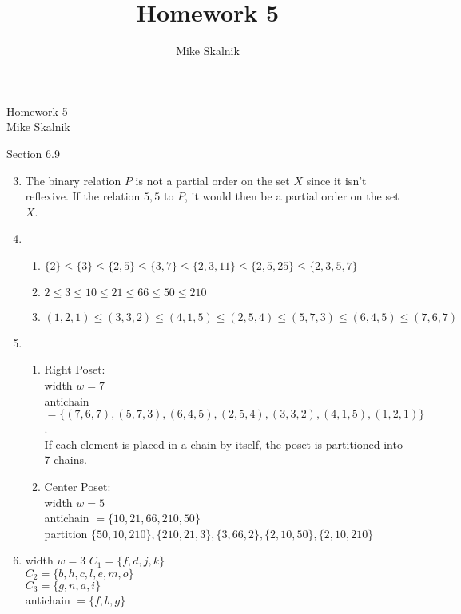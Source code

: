 \documentclass[12pt]{article}
\title{Homework 5}
\author{Mike Skalnik}
\newcommand{\s}[1]{\setcounter{enumi}{#1}}
\begin{document}
\begin{flushright}{\large Homework 5\\ Mike Skalnik}\end{flushright}

Section 6.9

\begin{enumerate}
  \s{2}
  
  \item The binary relation $P$ is not a partial order on the set $X$ since it isn't reflexive. If the relation ${5, 5}$ to $P$, it would then be a partial order on the set $X$.

  \s{5}
  
  \item
    \begin{enumerate}
      \item $\{2\} \le \{3\} \le \{2, 5\} \le \{3, 7\} \le \{2, 3, 11\} \le \{2, 5, 25\} \le \{2, 3, 5, 7\}$
      \item $2 \le 3 \le 10 \le 21 \le 66 \le 50 \le 210$

      \item $\left(1, 2, 1\right) \le \left(3, 3, 2\right) \le \left(4, 1, 5\right) \le \left(2, 5, 4\right) \le \left(5, 7, 3\right) \le \left(6, 4, 5\right) \le \left(7, 6, 7\right)$
    \end{enumerate}

  \s{9}
  
  \item
    \begin{enumerate}
      \item Right Poset: \\
        width $w = 7$\\
        antichain $ = \{\left(7, 6, 7\right), \left(5, 7, 3\right), \left(6, 4, 5\right), \left(2, 5, 4\right), \left(3, 3, 2\right), \left(4, 1, 5\right), \left(1, 2, 1\right)\}$. \\
        If each element is placed in a chain by itself, the poset is partitioned into 7 chains.
      \item Center Poset: \\
        width $w = 5$\\
        antichain $ = \{10, 21, 66, 210, 50\}$\\
        partition $\{50, 10, 210\}, \{210, 21, 3\}, \{3, 66, 2\}, \{2, 10, 50\}, \{2, 10, 210\}$
    \end{enumerate}

  \s{17}
  
  \item
    width $w = 3$
    $C_1 = \{f, d, j, k\}$\\
    $C_2 = \{b, h, c, l, e, m, o\}$\\
    $C_3 = \{g, n, a, i\}$\\
    antichain $ = \{f, b, g\}$
\end{enumerate}
\end{document}
